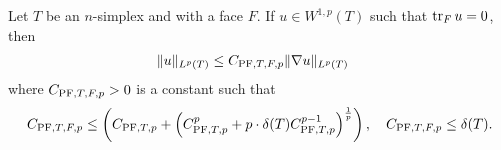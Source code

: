 \documentclass[10pt,a4paper]{article}
\begin{document}
\begin{lemma}\label{lemma:mixedbconsimplex}
    Let $T$ be an $n$-simplex and with a face $F$. 
    If $u \in W^{1,p}(T)$ such that $\operatorname{tr}_{F} u = 0$, then 
    \begin{align*}
        \| u \|_{L^{p}(T)}
        &
        \leq 
        C_{{\rm PF},T,F,p} \| \nabla u \|_{L^{p}(T)}
    \end{align*}
    where $C_{{\rm PF},T,F,p} > 0$ is a constant such that 
    \begin{align*}
        C_{{\rm PF},T,F,p}
        \leq 
        \left( C_{{\rm PF},T,p} + \left( C_{{\rm PF},T,p}^{p} + p \cdot {\delta}(T) C_{{\rm PF},T,p}^{p-1} \right)^{\frac 1 p} \right),  
        \quad 
        C_{{\rm PF},T,F,p}
        \leq 
        {\delta}(T)
        .
    \end{align*}
\end{lemma}
\end{document}
